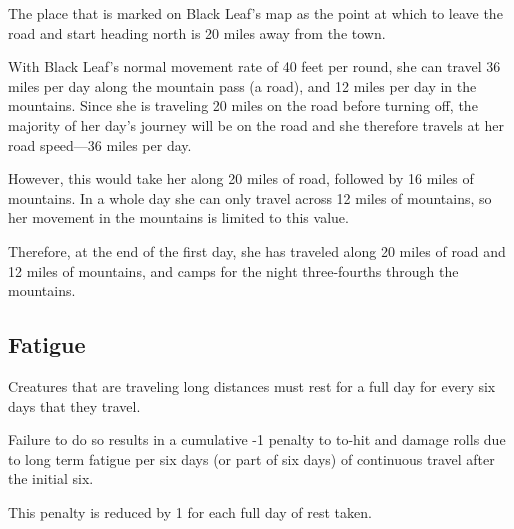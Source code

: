 \begin{multicols*}{2}
{The place that is marked on Black Leaf’s map as the point at which to leave the road and start heading north is 20 miles away from the town.

With Black Leaf’s normal movement rate of 40 feet per round, she can travel 36 miles per day along the mountain pass (a road), and 12 miles per day in the mountains. Since she is traveling 20 miles on the road before turning off, the majority of her day’s journey will be on the road and she therefore travels at her road speed—36 miles per day.

However, this would take her along 20 miles of road, followed by 16 miles of mountains. In a whole day she can only travel across 12 miles of mountains, so her movement in the mountains is limited to this value.

Therefore, at the end of the first day, she has traveled along 20 miles of road and 12 miles of mountains, and camps for the night three-fourths through the mountains.}

\subsection{Fatigue}
Creatures that are traveling long distances must rest for a full day for every six days that they travel.

Failure to do so results in a cumulative -1 penalty to to-hit and damage rolls due to long term fatigue per six days (or part of six days) of continuous travel after the initial six.

This penalty is reduced by 1 for each full day of rest taken.

\end{multicols*}
